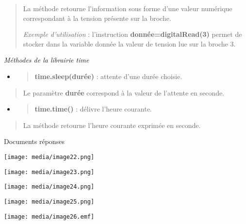 \documentclass[]{article}
\begin{document}
\begin{quote}
La méthode retourne l'information sous forme d'une valeur numérique
correspondant à la tension présente sur la broche.

\emph{Exemple d'utilisation} : l'instruction
\textbf{donnée=digitalRead(3)} permet de stocker dans la variable donnée
la valeur de tension lue sur la broche 3.
\end{quote}

\emph{Méthodes de la librairie time}

\begin{itemize}
\item
  \begin{quote}
  \textbf{time.sleep(durée)} : attente d'une durée choisie.
  \end{quote}
\end{itemize}

\begin{quote}
Le paramètre \textbf{durée} correspond à la valeur de l'attente en
seconde.
\end{quote}

\begin{itemize}
\item
  \begin{quote}
  \textbf{time.time()} : délivre l'heure courante.
  \end{quote}
\end{itemize}

\begin{quote}
La méthode retourne l'heure courante exprimée en seconde.
\end{quote}

Documents réponses

\texttt{[image: media/image22.png]}

\texttt{[image: media/image23.png]}

\texttt{[image: media/image24.png]}

\texttt{[image: media/image25.png]}

\texttt{[image: media/image26.emf]}
\end{document}
